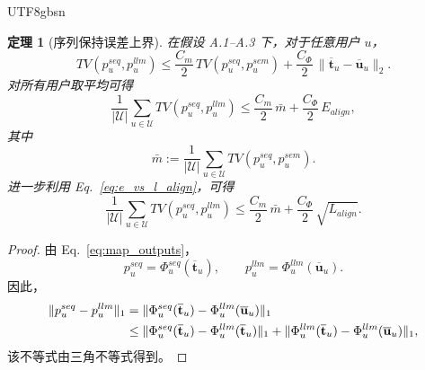 \documentclass{article}
\newtheorem{theorem}{定理}[section]
\begin{document}
\begin{CJK*}{UTF8}{gbsn}
\begin{theorem}[序列保持误差上界]
\label{thm:retention}
在假设 A.1--A.3 下，对于任意用户 $u$，
\begin{equation}
TV(p_u^{seq},p_u^{llm})
\le
\frac{C_m}{2}\,TV(p_u^{seq},p_u^{sem})
+
\frac{C_\Phi}{2}\,\|\overline{\mathbf{t}}_u-\overline{\mathbf{u}}_u\|_2.
\label{eq:user_bound}
\end{equation}
对所有用户取平均可得
\begin{equation}
\frac{1}{|\mathcal U|}\sum_{u\in\mathcal U}TV(p_u^{seq},p_u^{llm})
\le
\frac{C_m}{2}\,\bar m
+
\frac{C_\Phi}{2}\,E_{align},
\label{eq:avg_bound}
\end{equation}
其中
\begin{equation}
\bar m:=\frac{1}{|\mathcal U|}\sum_{u\in\mathcal U}TV(p_u^{seq},p_u^{sem}).
\label{eq:mbar}
\end{equation}
进一步利用 Eq.~\eqref{eq:e_vs_l_align}，可得
\begin{equation}
\frac{1}{|\mathcal U|}\sum_{u\in\mathcal U}TV(p_u^{seq},p_u^{llm})
\le
\frac{C_m}{2}\,\bar m
+
\frac{C_\Phi}{2}\,\sqrt{L_{align}}.
\label{eq:avg_bound_lalign}
\end{equation}
\end{theorem}

\begin{proof}
由 Eq.~\eqref{eq:map_outputs}，
\begin{equation}
p_u^{seq}=\Phi_u^{seq}(\overline{\mathbf{t}}_u),
\qquad
p_u^{llm}=\Phi_u^{llm}(\overline{\mathbf{u}}_u).
\label{eq:proof_start}
\end{equation}
因此，
\begin{align}
\|p_u^{seq}-p_u^{llm}\|_1
&=
\|\Phi_u^{seq}(\overline{\mathbf{t}}_u)-\Phi_u^{llm}(\overline{\mathbf{u}}_u)\|_1 \notag\\
&\le
\|\Phi_u^{seq}(\overline{\mathbf{t}}_u)-\Phi_u^{llm}(\overline{\mathbf{t}}_u)\|_1
+
\|\Phi_u^{llm}(\overline{\mathbf{t}}_u)-\Phi_u^{llm}(\overline{\mathbf{u}}_u)\|_1,
\label{eq:triangle_maps}
\end{align}
该不等式由三角不等式得到。


\end{proof}
\end{CJK*}
\end{document}
